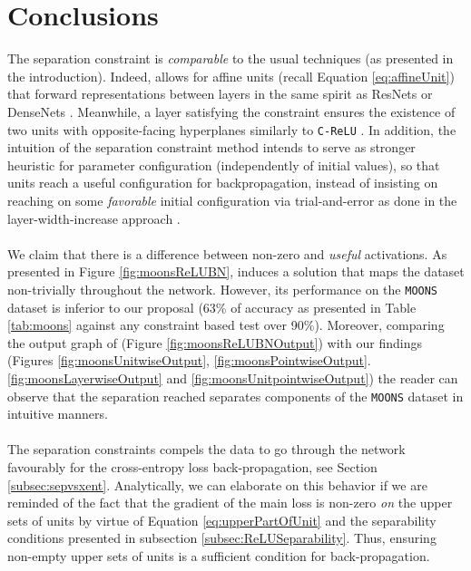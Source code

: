 \section{Conclusions}\label{sec:conclusions}


The separation constraint is \emph{comparable} to the usual techniques (as presented in the introduction). Indeed, \SepLayer allows for affine units (recall Equation \ref{eq:affineUnit}) that forward representations between layers in the same spirit as ResNets \cite{resnet} or DenseNets \cite{densenet}. Meanwhile, a layer satisfying the \SepPoint constraint ensures the existence of two units with opposite-facing hyperplanes similarly to \texttt{C-ReLU} \cite{crelu}. In addition, the intuition of the separation constraint method intends to serve as stronger heuristic for parameter configuration (independently of initial values), so that units reach a useful configuration for backpropagation, instead of insisting on reaching on some \emph{favorable} initial configuration via trial-and-error as done in the layer-width-increase approach \cite{wideresnet,inceptionv1}.   
\\\\
We claim that there is a difference between non-zero and \emph{useful} activations. As presented in Figure \ref{fig:moonsReLUBN}, \ReLUBN induces a solution that maps the dataset non-trivially throughout the network. However, its performance on the \texttt{MOONS} dataset is inferior to our proposal (63\% of accuracy as presented in Table \ref{tab:moons} against any constraint based test over 90\%). Moreover, comparing the output graph of \ReLUBN (Figure \ref{fig:moonsReLUBNOutput}) with our findings (Figures \ref{fig:moonsUnitwiseOutput}, \ref{fig:moonsPointwiseOutput}. \ref{fig:moonsLayerwiseOutput} and \ref{fig:moonsUnitpointwiseOutput}) the reader can observe that the separation reached separates components of the \texttt{MOONS} dataset in intuitive manners.  
\\\\
The separation constraints compels the data to go through the network favourably for the cross-entropy loss back-propagation, see Section \ref{subsec:sepvsxent}. Analytically, we can elaborate on this behavior if we are reminded of the fact that the gradient of the main loss is non-zero \emph{on} the upper sets of units by virtue of Equation \ref{eq:upperPartOfUnit} and the separability conditions presented in subsection \ref{subsec:ReLUSeparability}. Thus, ensuring non-empty upper sets of units is a sufficient condition for back-propagation. 
